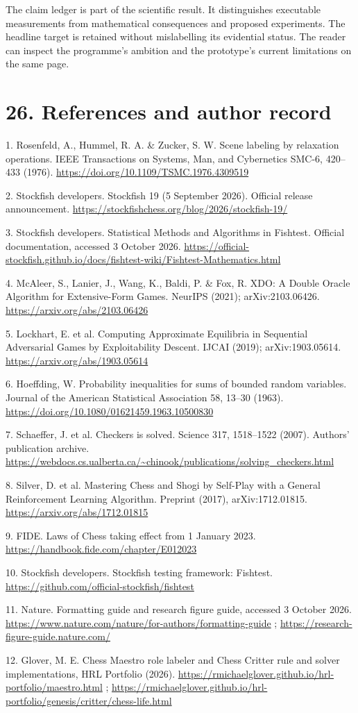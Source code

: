 \documentclass[10pt]{article}
\begin{document}
The claim ledger is part of the scientific result. It distinguishes executable measurements from mathematical consequences and proposed experiments. The headline target is retained without mislabelling its evidential status. The reader can inspect the programme's ambition and the prototype's current limitations on the same page.

\clearpage
\section*{26. References and author record}
1. Rosenfeld, A., Hummel, R. A. \& Zucker, S. W. Scene labeling by relaxation operations. IEEE Transactions on Systems, Man, and Cybernetics SMC-6, 420--433 (1976). \url{https://doi.org/10.1109/TSMC.1976.4309519}\par
2. Stockfish developers. Stockfish 19 (5 September 2026). Official release announcement. \url{https://stockfishchess.org/blog/2026/stockfish-19/}\par
3. Stockfish developers. Statistical Methods and Algorithms in Fishtest. Official documentation, accessed 3 October 2026. \url{https://official-stockfish.github.io/docs/fishtest-wiki/Fishtest-Mathematics.html}\par
4. McAleer, S., Lanier, J., Wang, K., Baldi, P. \& Fox, R. XDO: A Double Oracle Algorithm for Extensive-Form Games. NeurIPS (2021); arXiv:2103.06426. \url{https://arxiv.org/abs/2103.06426}\par
5. Lockhart, E. et al. Computing Approximate Equilibria in Sequential Adversarial Games by Exploitability Descent. IJCAI (2019); arXiv:1903.05614. \url{https://arxiv.org/abs/1903.05614}\par
6. Hoeffding, W. Probability inequalities for sums of bounded random variables. Journal of the American Statistical Association 58, 13--30 (1963). \url{https://doi.org/10.1080/01621459.1963.10500830}\par
7. Schaeffer, J. et al. Checkers is solved. Science 317, 1518--1522 (2007). Authors' publication archive. \url{https://webdocs.cs.ualberta.ca/~chinook/publications/solving_checkers.html}\par
8. Silver, D. et al. Mastering Chess and Shogi by Self-Play with a General Reinforcement Learning Algorithm. Preprint (2017), arXiv:1712.01815. \url{https://arxiv.org/abs/1712.01815}\par
9. FIDE. Laws of Chess taking effect from 1 January 2023. \url{https://handbook.fide.com/chapter/E012023}\par
10. Stockfish developers. Stockfish testing framework: Fishtest. \url{https://github.com/official-stockfish/fishtest}\par
11. Nature. Formatting guide and research figure guide, accessed 3 October 2026. \url{https://www.nature.com/nature/for-authors/formatting-guide} ; \url{https://research-figure-guide.nature.com/}\par
12. Glover, M. E. Chess Maestro role labeler and Chess Critter rule and solver implementations, HRL Portfolio (2026). \url{https://rmichaelglover.github.io/hrl-portfolio/maestro.html} ; \url{https://rmichaelglover.github.io/hrl-portfolio/genesis/critter/chess-life.html}\par
\end{document}

